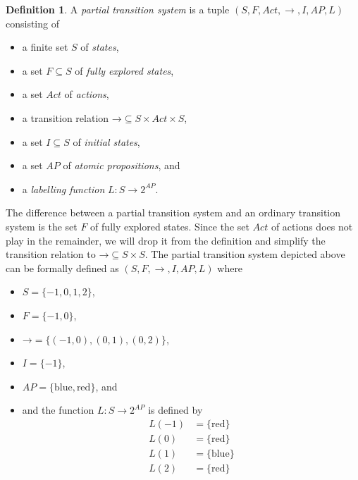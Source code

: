 \documentclass[12pt]{article}
\theoremstyle{definition}
\newtheorem{definition}{Definition}
\newenvironment{franck}{\color{red}}{\color{black}}
\begin{document}
\begin{definition}
A \emph{partial transition system} is a tuple $(S, F, \mathit{Act}, \rightarrow, I, \mathit{AP}, L)$ consisting of
\begin{itemize}
\item 
a \begin{franck}finite\end{franck} set $S$ of \emph{states},
\item
a set $F \subseteq S$ of \emph{fully explored states},
\item
a set $\mathit{Act}$ of \emph{actions},
\item
a transition relation $\mathord{\rightarrow} \subseteq S \times \mathit{Act} \times S$,
\item
a set $I \subseteq S$ of \emph{initial states},
\item
a set $\mathit{AP}$ of \emph{atomic propositions}, and
\item
a \emph{labelling function} $L : S \to 2^{\mathit{AP}}$.
\end{itemize}
\end{definition}

The difference between a partial transition system and an ordinary transition system is the set $F$ of fully explored states.  Since the set $\mathit{Act}$ of actions does not play in the remainder, we will drop it from the definition and simplify the transition relation to $\mathord{\rightarrow} \subseteq S \times S$. The partial transition system depicted above can be formally defined as $(S, F, \rightarrow, I, \mathit{AP}, L)$ where
\begin{itemize}
\item 
$S = \{ -1, 0, 1, 2 \}$,
\item
$F = \{ -1, 0 \}$,
\item
$\mathord{\rightarrow} = \{ (-1, 0), (0, 1), (0, 2) \}$,
\item
$I = \{ -1 \}$,
\item
$\mathit{AP} = \{ \mbox{blue}, \mbox{red} \}$, and
\item
and the function $L : S \to 2^{\mathit{AP}}$ is defined by
\begin{align*}
L(-1) & = \{ \mbox{red} \}\\
L(0) & = \{ \mbox{red} \}\\
L(1) & = \{ \mbox{blue} \}\\
L(2) & = \{ \mbox{red} \}
\end{align*}
\end{itemize} 
\end{document}
